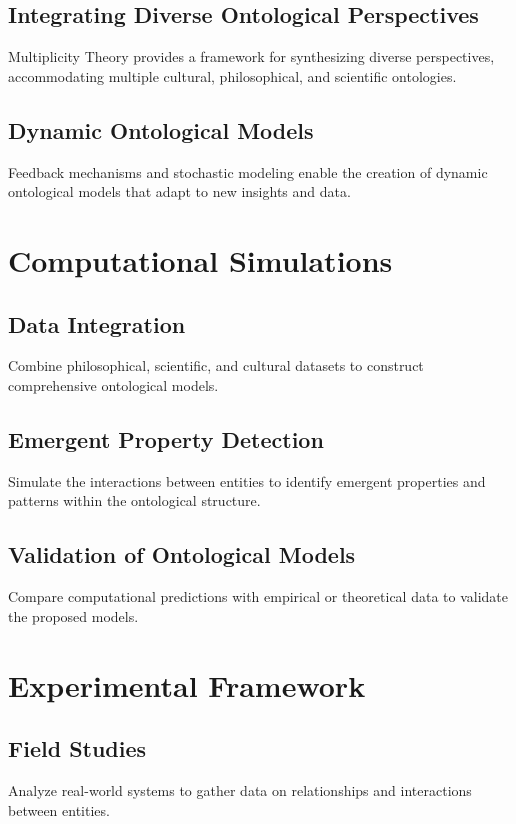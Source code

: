 \documentclass{article}
\theoremstyle{plain}
\begin{document}
\subsection{Integrating Diverse Ontological Perspectives}
Multiplicity Theory provides a framework for synthesizing diverse perspectives, accommodating multiple cultural, philosophical, and scientific ontologies.

\subsection{Dynamic Ontological Models}
Feedback mechanisms and stochastic modeling enable the creation of dynamic ontological models that adapt to new insights and data.

\section{Computational Simulations}

\subsection{Data Integration}
Combine philosophical, scientific, and cultural datasets to construct comprehensive ontological models.

\subsection{Emergent Property Detection}
Simulate the interactions between entities to identify emergent properties and patterns within the ontological structure.

\subsection{Validation of Ontological Models}
Compare computational predictions with empirical or theoretical data to validate the proposed models.

\section{Experimental Framework}

\subsection{Field Studies}
Analyze real-world systems to gather data on relationships and interactions between entities.
\end{document}
